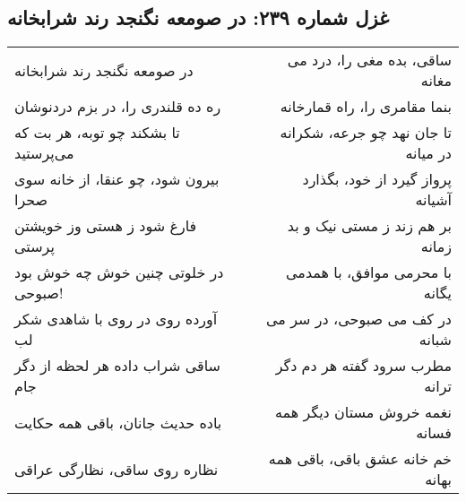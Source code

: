 \begin{center}
\section*{غزل شماره ۲۳۹: در صومعه نگنجد رند شرابخانه}
\label{sec:239}
\begin{longtable}{l p{0.5cm} r}
در صومعه نگنجد رند شرابخانه
&&
ساقی، بده مغی را، درد می مغانه
\\
ره ده قلندری را، در بزم دردنوشان
&&
بنما مقامری را، راه قمارخانه
\\
تا بشکند چو توبه، هر بت که می‌پرستید
&&
تا جان نهد چو جرعه، شکرانه در میانه
\\
بیرون شود، چو عنقا، از خانه سوی صحرا
&&
پرواز گیرد از خود، بگذارد آشیانه
\\
فارغ شود ز هستی وز خویشتن پرستی
&&
بر هم زند ز مستی نیک و بد زمانه
\\
در خلوتی چنین خوش چه خوش بود صبوحی!
&&
با محرمی موافق، با همدمی یگانه
\\
آورده روی در روی با شاهدی شکر لب
&&
در کف می صبوحی، در سر می شبانه
\\
ساقی شراب داده هر لحظه از دگر جام
&&
مطرب سرود گفته هر دم دگر ترانه
\\
باده حدیث جانان، باقی همه حکایت
&&
نغمه خروش مستان دیگر همه فسانه
\\
نظاره روی ساقی، نظارگی عراقی
&&
خم خانه عشق باقی، باقی همه بهانه
\\
\end{longtable}
\end{center}
